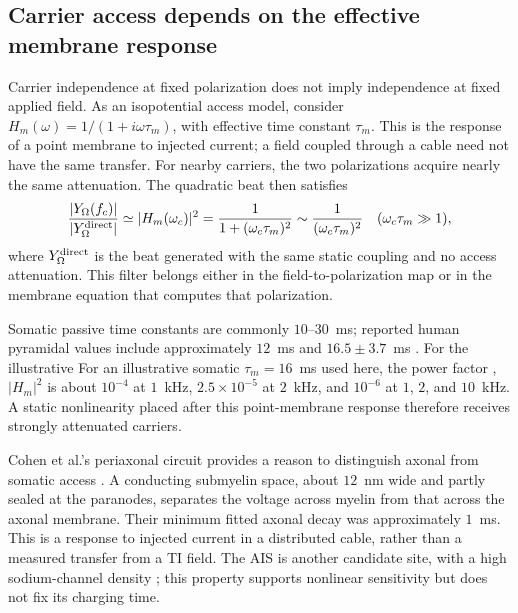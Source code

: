 \documentclass[11pt,a4paper]{article}
\providecommand{\DIFaddtex}[1]{{\protect\color{blue} \sf #1}} %
\providecommand{\DIFdeltex}[1]{{\protect\color{red} \scriptsize #1}} %
\providecommand{\DIFaddbegin}{} %
\providecommand{\DIFaddend}{} %
\providecommand{\DIFdelbegin}{} %
\providecommand{\DIFdelend}{} %
\providecommand{\DIFadd}[1]{\texorpdfstring{\DIFaddtex{#1}}{#1}} %
\providecommand{\DIFdel}[1]{\texorpdfstring{\DIFdeltex{#1}}{}} %
\begin{document}
\subsection{Carrier access depends on the effective membrane response}\label{sec:khz}
Carrier independence at fixed polarization does not imply independence at fixed
applied field. As an isopotential access model, consider
$H_m(\omega)=1/(1+i\omega\tau_m)$, with effective time constant $\tau_m$.
This is the response of a point membrane to injected current; a field coupled
through a cable need not have the same transfer.
For nearby carriers, the two polarizations acquire nearly the same attenuation.
The quadratic beat then satisfies
\begin{equation}
\frac{|Y_\Omega(f_c)|}{|Y_\Omega^{\rm direct}|}
\simeq |H_m(\omega_c)|^2
=\frac{1}{1+(\omega_c\tau_m)^2}
\sim\frac{1}{(\omega_c\tau_m)^2}
\quad(\omega_c\tau_m\gg1),
\label{eq:khz}
\end{equation}
where $Y_\Omega^{\rm direct}$ is the beat generated with the same static coupling
and no access attenuation. This filter belongs either in the field-to-polarization
map or in the membrane equation that computes that polarization.

\DIFdelbegin \DIFdel{Somatic passive time constants are commonly $10$--$30$~ms; reported human pyramidal
values include approximately $12$~ms \cite{deitcher2017} and $16.5\pm3.7$~ms
\cite{eyal2016}. For the illustrative }\DIFdelend \DIFaddbegin \DIFadd{For an illustrative somatic }\DIFaddend $\tau_m=16$~ms\DIFdelbegin \DIFdel{used here, the power factor
}\DIFdelend \DIFaddbegin \DIFadd{, }\DIFaddend $|H_m|^2$ is about
$10^{-4}$\DIFdelbegin \DIFdel{at $1$~kHz}\DIFdelend , $2.5\times10^{-5}$\DIFdelbegin \DIFdel{at $2$~kHz}\DIFdelend , and $10^{-6}$ at \DIFaddbegin \DIFadd{$1$, $2$, and }\DIFaddend $10$~kHz.
\DIFdelbegin \DIFdel{A static nonlinearity placed after this point-membrane response
therefore receives strongly attenuated carriers.
}%

\DIFdel{Cohen et al.'s periaxonal circuit provides a reason to distinguish axonal from
somatic access \cite{cohen2020periaxonal}. A conducting submyelin space, about
$12$~nm wide and partly sealed at the paranodes, separates the voltage across
myelin from that across the axonal membrane. Their minimum fitted axonal decay
was approximately $1$~ms. This is a response to injected current in a distributed
cable, rather than a measured transfer from a TI field. The AIS is another candidate
site, with a high sodium-channel density \cite{kole2008ais}; this property supports
nonlinear sensitivity but does not fix its charging time.
}%
\end{document}
